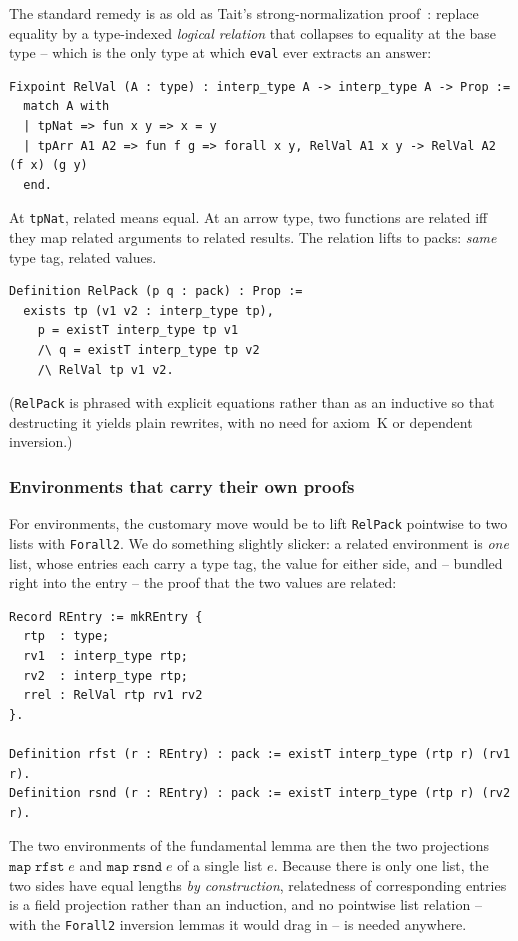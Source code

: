\documentclass[11pt,a4paper]{article}
\theoremstyle{plain}
\theoremstyle{definition}
\theoremstyle{remark}
\begin{document}
The standard remedy is as old as Tait's strong-normalization
proof~\cite{tait}: replace equality by a type-indexed \emph{logical
relation} that collapses to equality at the base type -- which is the
only type at which \texttt{eval} ever extracts an answer:

\begin{lstlisting}
Fixpoint RelVal (A : type) : interp_type A -> interp_type A -> Prop :=
  match A with
  | tpNat => fun x y => x = y
  | tpArr A1 A2 => fun f g => forall x y, RelVal A1 x y -> RelVal A2 (f x) (g y)
  end.
\end{lstlisting}

At \texttt{tpNat}, related means equal.  At an arrow type, two
functions are related iff they map related arguments to related
results.  The relation lifts to packs: \emph{same} type tag, related
values.

\begin{lstlisting}
Definition RelPack (p q : pack) : Prop :=
  exists tp (v1 v2 : interp_type tp),
    p = existT interp_type tp v1
    /\ q = existT interp_type tp v2
    /\ RelVal tp v1 v2.
\end{lstlisting}

(\texttt{RelPack} is phrased with explicit equations rather than as an
inductive so that destructing it yields plain rewrites, with no need
for axiom~K or dependent inversion.)

\subsubsection{Environments that carry their own proofs}

For environments, the customary move would be to lift \texttt{RelPack}
pointwise to two lists with \texttt{Forall2}.  We do something
slightly slicker: a related environment is \emph{one} list, whose
entries each carry a type tag, the value for either side, and --
bundled right into the entry -- the proof that the two values are
related:

\begin{lstlisting}
Record REntry := mkREntry {
  rtp  : type;
  rv1  : interp_type rtp;
  rv2  : interp_type rtp;
  rrel : RelVal rtp rv1 rv2
}.

Definition rfst (r : REntry) : pack := existT interp_type (rtp r) (rv1 r).
Definition rsnd (r : REntry) : pack := existT interp_type (rtp r) (rv2 r).
\end{lstlisting}

The two environments of the fundamental lemma are then the two
projections $\texttt{map}\;\texttt{rfst}\;e$ and
$\texttt{map}\;\texttt{rsnd}\;e$ of a single list $e$.  Because there
is only one list, the two sides have equal lengths \emph{by
construction}, relatedness of corresponding entries is a field
projection rather than an induction, and no pointwise list relation
-- with the \texttt{Forall2} inversion lemmas it would drag in -- is
needed anywhere.
\end{document}
